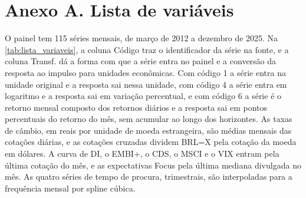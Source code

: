 \documentclass[preprint,authoryear,review,12pt]{elsarticle}
\begin{document}


\section*{Anexo A. Lista de variáveis}\label{anexo-A}

O painel tem 115 séries mensais, de março de 2012 a dezembro de 2025. Na \autoref{tab:lista_variaveis}, a coluna Código traz o identificador da série na fonte, e a coluna Transf. dá a forma com que a série entra no painel e a conversão da resposta ao impulso para unidades econômicas. Com código 1 a série entra na unidade original e a resposta sai nessa unidade, com código 4 a série entra em logaritmo e a resposta sai em variação percentual, e com código 6 a série é o retorno mensal composto dos retornos diários e a resposta sai em pontos percentuais do retorno do mês, sem acumular ao longo dos horizontes. As taxas de câmbio, em reais por unidade de moeda estrangeira, são médias mensais das cotações diárias, e as cotações cruzadas dividem BRL=X pela cotação da moeda em dólares. A curva de DI, o EMBI+, o CDS, o MSCI e o VIX entram pela última cotação do mês, e as expectativas Focus pela última mediana divulgada no mês. As quatro séries de tempo de procura, trimestrais, são interpoladas para a frequência mensal por spline cúbica.
\end{document}
